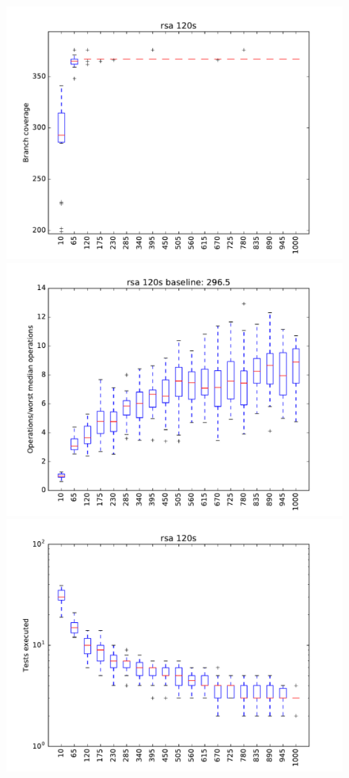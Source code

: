 \begin{figure}
\includegraphics[width=\columnwidth]{graphs/rsarand120}
\includegraphics[width=\columnwidth]{graphs/opsrsarand120}
\includegraphics[width=\columnwidth]{graphs/execrsarand120}
\end{figure}


